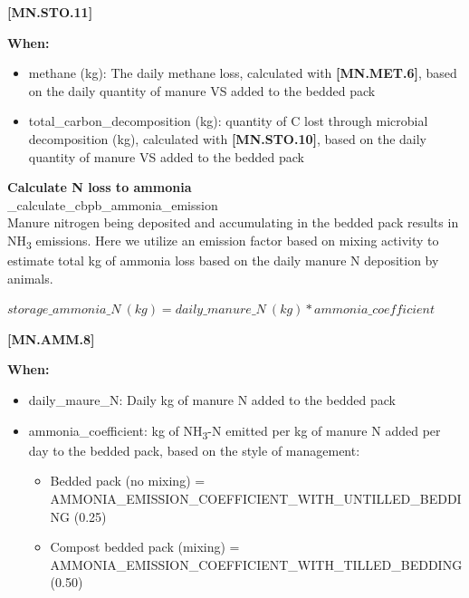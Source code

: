 \begin{refsection}
            {\raggedleft \textbf{[MN.STO.11]}\par}
            \vspace{0.5cm}

        \textbf{When:}

        \begin{itemize}
            \item methane (kg): The daily methane loss, calculated with \textbf{[MN.MET.6]}, based on the daily quantity of manure VS added to the bedded pack
            \item total\_carbon\_decomposition (kg): quantity of C lost through microbial decomposition (kg), calculated with \textbf{[MN.STO.10]}, based on the daily quantity of manure VS added to the bedded pack
        \end{itemize}
        \vspace{0.5cm}  

    \textbf{Calculate N loss to ammonia}\\
    \_calculate\_cbpb\_ammonia\_emission\\

    Manure nitrogen being deposited and accumulating in the bedded pack results in NH\textsubscript{3} emissions. Here we utilize an emission factor based on mixing activity \parencite{Hanson2024} to estimate total kg of ammonia loss based on the daily manure N deposition by animals. 
        \vspace{0.5cm}        
    
    \begin{center}
        \(storage\_ammonia\_N\ (kg)  = daily\_manure\_N\ (kg) * ammonia\_coefficient\)
    \end{center}
    \vspace{0.5cm} 
    
            {\raggedleft \textbf{[MN.AMM.8]}\par}
            \vspace{0.5cm}

        \textbf{When:}

        \begin{itemize}
            \item daily\_maure\_N: Daily kg of manure N added to the bedded pack
            \item ammonia\_coefficient: kg of NH\textsubscript{3}-N emitted per kg of manure N added per day to the bedded pack, based on the style of management:
            \begin{itemize}
                \item Bedded pack (no mixing) = AMMONIA\_EMISSION\_COEFFICIENT\_WITH\_UNTILLED\_BEDDING (0.25) 
                \item Compost bedded pack (mixing) = AMMONIA\_EMISSION\_COEFFICIENT\_WITH\_TILLED\_BEDDING (0.50)
            \end{itemize}
        \end{itemize}
        \vspace{0.5cm} 




\end{refsection}
